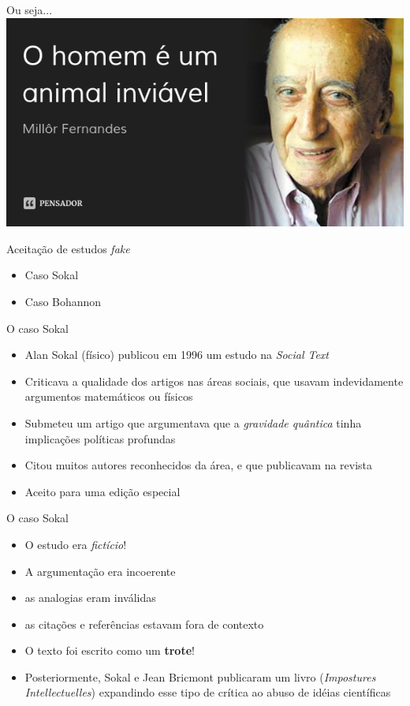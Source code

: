 \documentclass{beamer}
\begin{document}
\begin{frame}{Ou seja...}
  \includegraphics[width=\textwidth]{Etapas/millor}
\end{frame}

\begin{frame}{Aceitação de estudos {\em fake}}
  \begin{itemize}
  \item Caso Sokal
  \item Caso Bohannon
  \end{itemize}
\end{frame}

\begin{frame}{O caso Sokal}
  \begin{itemize}
  \item Alan Sokal (físico) publicou em 1996 um estudo na {\em Social
      Text}
  \item Criticava a qualidade dos artigos nas áreas sociais, que
    usavam indevidamente argumentos matemáticos ou físicos
  \item Submeteu um artigo que argumentava que a {\em gravidade
      quântica} tinha implicações políticas profundas
  \item Citou muitos autores reconhecidos da área, e que publicavam na
    revista
  \item Aceito para uma edição especial
  \end{itemize}
\end{frame}

\begin{frame}{O caso Sokal}
  \begin{itemize}
  \item O estudo era {\em fictício}!
  \item A argumentação era incoerente
  \item as analogias eram inválidas
  \item as citações e referências estavam fora de contexto
  \item O texto foi escrito como um {\bf trote}!
  \item Posteriormente, Sokal e Jean Bricmont publicaram um livro
    ({\em Impostures Intellectuelles}) expandindo esse tipo de crítica
    ao abuso de idéias científicas
  \end{itemize}
\end{frame}
\end{document}
